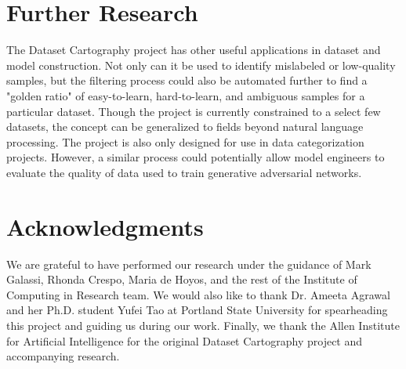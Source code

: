 \documentclass[11pt, a4paper, twocolumn]{article}
\begin{document}
	\section{Further Research}
	
	The Dataset Cartography project has other useful applications in dataset and model construction. Not only can it be used to identify mislabeled or low-quality samples, but the filtering process could also be automated further to find a "golden ratio" of easy-to-learn, hard-to-learn, and ambiguous samples for a particular dataset. Though the project is currently constrained to a select few datasets, the concept can be generalized to fields beyond natural language processing. The project is also only designed for use in data categorization projects. However, a similar process could potentially allow model engineers to evaluate the quality of data used to train generative adversarial networks.
	
	\section{Acknowledgments}
	
	We are grateful to have performed our research under the guidance of Mark Galassi, Rhonda Crespo, Maria de Hoyos, and the rest of the Institute of Computing in Research team. We would also like to thank Dr. Ameeta Agrawal and her Ph.D. student Yufei Tao at Portland State University for spearheading this project and guiding us during our work. Finally, we thank the Allen Institute for Artificial Intelligence for the original Dataset Cartography project and accompanying research.
	
	
	
	\nocite{*}
	
	\printbibliography[title={Bibliography}]
	
\end{document}
